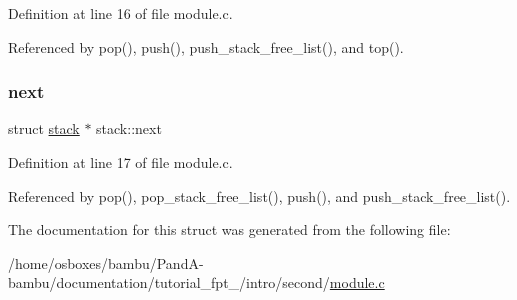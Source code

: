 Definition at line 16 of file module.\+c.



Referenced by pop(), push(), push\+\_\+stack\+\_\+free\+\_\+list(), and top().

\mbox{\label{structstack_a1ae95552c67c85b2a6e73d61e8006bf7}} 
\subsubsection{\texorpdfstring{next}{next}}
{\footnotesize\ttfamily struct \hyperlink{structstack}{stack} $\ast$ stack\+::next}



Definition at line 17 of file module.\+c.



Referenced by pop(), pop\+\_\+stack\+\_\+free\+\_\+list(), push(), and push\+\_\+stack\+\_\+free\+\_\+list().



The documentation for this struct was generated from the following file\+:\begin{DoxyCompactItemize}
\item 
/home/osboxes/bambu/\+Pand\+A-\/bambu/documentation/tutorial\+\_\+fpt\+\_/intro/second/\hyperlink{tutorial__fpt__2017_2intro_2second_2module_8c}{module.\+c}\end{DoxyCompactItemize}
